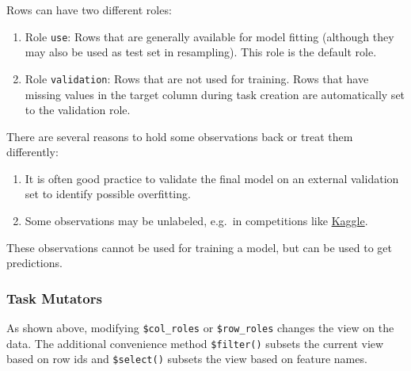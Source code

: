 \documentclass[]{scrbook}
\newenvironment{Shaded}{\begin{snugshade}}{\end{snugshade}}
\newcommand{\CommentTok}[1]{\textcolor[rgb]{0.56,0.35,0.01}{\textit{#1}}}
\newcommand{\DecValTok}[1]{\textcolor[rgb]{0.00,0.00,0.81}{#1}}
\newcommand{\KeywordTok}[1]{\textcolor[rgb]{0.13,0.29,0.53}{\textbf{#1}}}
\newcommand{\NormalTok}[1]{#1}
\newcommand{\OperatorTok}[1]{\textcolor[rgb]{0.81,0.36,0.00}{\textbf{#1}}}
\newcommand{\StringTok}[1]{\textcolor[rgb]{0.31,0.60,0.02}{#1}}
\providecommand{\tightlist}{%
  \setlength{\itemsep}{0pt}\setlength{\parskip}{0pt}}
\renewenvironment{Shaded} {\begin{snugshade}\small} {\end{snugshade}}
\begin{document}
Rows can have two different roles:

\begin{enumerate}
\def\labelenumi{\arabic{enumi}.}
\item
  Role \texttt{use}:
  Rows that are generally available for model fitting (although they may also be used as test set in resampling).
  This role is the default role.
\item
  Role \texttt{validation}:
  Rows that are not used for training.
  Rows that have missing values in the target column during task creation are automatically set to the validation role.
\end{enumerate}

There are several reasons to hold some observations back or treat them differently:

\begin{enumerate}
\def\labelenumi{\arabic{enumi}.}
\tightlist
\item
  It is often good practice to validate the final model on an external validation set to identify possible overfitting.
\item
  Some observations may be unlabeled, e.g.~in competitions like \href{https://www.kaggle.com/}{Kaggle}.
\end{enumerate}

These observations cannot be used for training a model, but can be used to get predictions.

\hypertarget{tasks-mutators}{%
\subsubsection{Task Mutators}\label{tasks-mutators}}

As shown above, modifying \texttt{\$col\_roles} or \texttt{\$row\_roles} changes the view on the data.
The additional convenience method \texttt{\$filter()} subsets the current view based on row ids and \texttt{\$select()} subsets the view based on feature names.

\begin{Shaded}
\end{Shaded}
\end{document}
